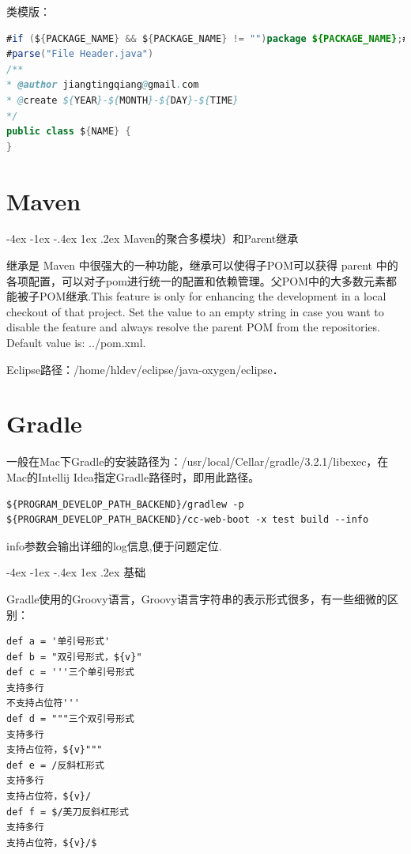 \documentclass[12pt]{book}
\makeatletter
\numberwithin{dummy}{section}
\theoremstyle{ocrenumbox}
\theoremstyle{blacknumex}
\theoremstyle{blacknumbox}
\theoremstyle{ocrenum}
\renewcommand{\section}{\@startsection{section}{1}{\z@}
	{-4ex \@plus -1ex \@minus -.4ex}
	{1ex \@plus.2ex }
	{\normalfont\large\sffamily\bfseries}}
\makeatother
\begin{document}
类模版：

\begin{lstlisting}[language=Java]
#if (${PACKAGE_NAME} && ${PACKAGE_NAME} != "")package ${PACKAGE_NAME};#end
#parse("File Header.java")
/**
* @author jiangtingqiang@gmail.com
* @create ${YEAR}-${MONTH}-${DAY}-${TIME}
*/
public class ${NAME} {
}
\end{lstlisting}

\chapter{Maven}

\section{Maven的聚合多模块）和Parent继承}

继承是 Maven 中很强大的一种功能，继承可以使得子POM可以获得 parent 中的各项配置，可以对子pom进行统一的配置和依赖管理。父POM中的大多数元素都能被子POM继承.This feature is only for enhancing the development in a local checkout of that project. Set the value to an empty string in case you want to disable the feature and always resolve the parent POM from the repositories.
Default value is: ../pom.xml.

Eclipse路径：/home/hldev/eclipse/java-oxygen/eclipse．



\chapter{Gradle}

一般在Mac下Gradle的安装路径为：/usr/local/Cellar/gradle/3.2.1/libexec，在Mac的Intellij Idea指定Gradle路径时，即用此路径。

\begin{lstlisting}
${PROGRAM_DEVELOP_PATH_BACKEND}/gradlew -p ${PROGRAM_DEVELOP_PATH_BACKEND}/cc-web-boot -x test build --info
\end{lstlisting}

info参数会输出详细的log信息,便于问题定位.

\section{基础}

Gradle使用的Groovy语言，Groovy语言字符串的表示形式很多，有一些细微的区别：

\begin{lstlisting}
def a = '单引号形式'
def b = "双引号形式，${v}"
def c = '''三个单引号形式
支持多行
不支持占位符'''
def d = """三个双引号形式
支持多行
支持占位符，${v}"""
def e = /反斜杠形式
支持多行
支持占位符，${v}/
def f = $/美刀反斜杠形式
支持多行
支持占位符，${v}/$
\end{lstlisting}
\end{document}
